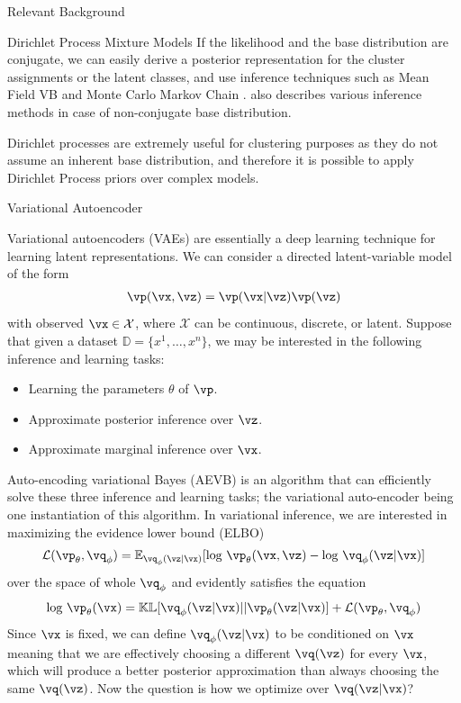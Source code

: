 \documentclass{article}
\begin{document}
\begin{psection}{Relevant Background}
\begin{psubsection}{Dirichlet Process Mixture Models}
	If the likelihood and the base distribution are conjugate, we can easily derive a posterior representation for the cluster assignments or the latent classes, and use inference techniques such as Mean Field VB \citep{blei} and Monte Carlo Markov Chain \citep{esc-west, neal}.	 also describes various inference methods in case of non-conjugate base distribution.

	Dirichlet processes are extremely useful for clustering purposes as they do not assume an inherent base distribution, and therefore it is possible to apply Dirichlet Process priors over complex models.

\end{psubsection}

\begin{psubsection}{Variational Autoencoder}

    Variational autoencoders (VAEs) are essentially a deep learning technique for learning latent representations. We can consider a directed latent-variable model of the form
    \begin{align*}
        \vp(\vx,\vz)=\vp(\vx|\vz)\vp(\vz)
    \end{align*}
    with observed $\vx \in \mathcal{X}$, where $\mathcal{X}$ can be continuous, discrete, or latent. Suppose that given a dataset $\mathbb{D}= \{x^1,\ldots,x^n\}$, we may be interested in the following inference and learning tasks:
    \begin{itemize}
        \item Learning the parameters $\theta$ of $\vp$.
        \item Approximate posterior inference over $\vz$.
        \item Approximate marginal inference over $\vx$.
    \end{itemize}

    Auto-encoding variational Bayes (AEVB) is an algorithm that can efficiently solve these three inference and learning tasks; the variational auto-encoder being one instantiation of this algorithm. In variational inference, we are interested in maximizing the evidence lower bound (ELBO)
    \begin{align*}
        \mathcal{L}(\vp_\theta,\vq_\phi)=\mathbb{E}_{\vq_\phi(\vz|\vx)}[\text{log } \vp_\theta(\vx,\vz)-\text{log } \vq_\phi(\vz|\vx)]
    \end{align*}
    over the space of whole $\vq_\phi$ and evidently satisfies the equation
    \begin{align*}
        \text{log } \vp_\theta(\vx)= \mathbb{KL}[\vq_\phi(\vz|\vx)||\vp_\theta(\vz|\vx)]+\mathcal{L}(\vp_\theta,\vq_\phi)
    \end{align*}
    Since $\vx$ is fixed, we can define $\vq_\phi(\vz|\vx)$ to be conditioned on $\vx$ meaning that we are effectively choosing a different $\vq(\vz)$ for every $\vx$, which will produce a better posterior approximation than always choosing the same $\vq(\vz)$. Now the question is how we optimize over $\vq(\vz|\vx)$?


\end{psubsection}
\end{psection}
\end{document}
